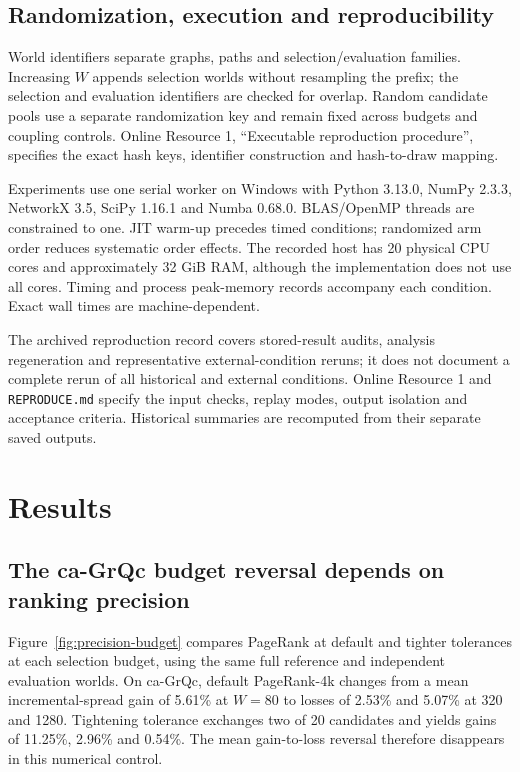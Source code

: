 \documentclass[smallextended]{svjour3}
\begin{document}
\subsection{Randomization, execution and reproducibility}
World identifiers separate graphs, paths and selection/evaluation families. Increasing $W$ appends selection worlds without resampling the prefix; the selection and evaluation identifiers are checked for overlap. Random candidate pools use a separate randomization key and remain fixed across budgets and coupling controls. Online Resource 1, ``Executable reproduction procedure'', specifies the exact hash keys, identifier construction and hash-to-draw mapping.

Experiments use one serial worker on Windows with Python 3.13.0, NumPy 2.3.3, NetworkX 3.5, SciPy 1.16.1 and Numba 0.68.0. BLAS/OpenMP threads are constrained to one. JIT warm-up precedes timed conditions; randomized arm order reduces systematic order effects. The recorded host has 20 physical CPU cores and approximately 32 GiB RAM, although the implementation does not use all cores. Timing and process peak-memory records accompany each condition. Exact wall times are machine-dependent.

The archived reproduction record covers stored-result audits, analysis regeneration and representative external-condition reruns; it does not document a complete rerun of all historical and external conditions. Online Resource 1 and \texttt{REPRODUCE.md} specify the input checks, replay modes, output isolation and acceptance criteria. Historical summaries are recomputed from their separate saved outputs.

\section{Results}
\subsection{The ca-GrQc budget reversal depends on ranking precision}
Figure~\ref{fig:precision-budget} compares PageRank at default and tighter tolerances at each selection budget, using the same full reference and independent evaluation worlds. On ca-GrQc, default PageRank-4k changes from a mean incremental-spread gain of 5.61\% at $W=80$ to losses of 2.53\% and 5.07\% at 320 and 1280. Tightening tolerance exchanges two of 20 candidates and yields gains of 11.25\%, 2.96\% and 0.54\%. The mean gain-to-loss reversal therefore disappears in this numerical control.
\end{document}
